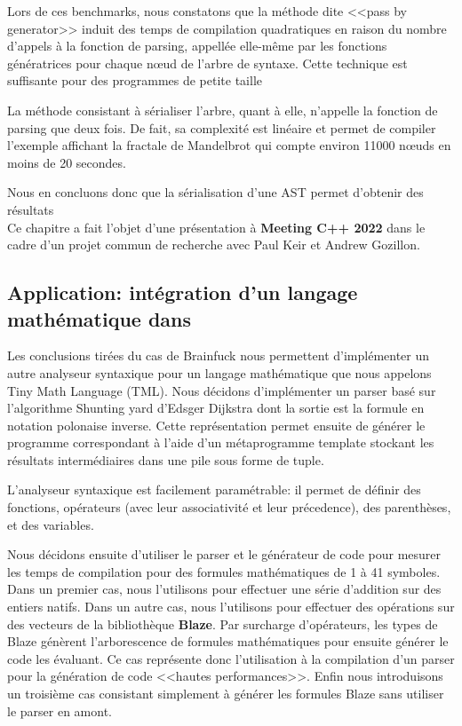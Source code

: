 \documentclass[main]{subfiles}
\begin{document}
Lors de ces benchmarks, nous constatons que la m\'ethode dite
<<pass by generator>> induit des temps de compilation quadratiques en raison
du nombre d'appels \`a la fonction de parsing, appell\'ee elle-m\^eme par les
fonctions g\'en\'eratrices pour chaque n\oe{}ud de l'arbre de syntaxe.
Cette technique est suffisante pour des programmes de petite taille

La m\'ethode consistant \`a s\'erialiser l'arbre, quant \`a elle, n'appelle
la fonction de parsing que deux fois. De fait, sa complexit\'e est lin\'eaire
et permet de compiler l'exemple affichant la fractale de Mandelbrot qui compte
environ 11000 n\oe{}uds en moins de 20 secondes.

Nous en concluons donc que la s\'erialisation d'une AST permet d'obtenir des
r\'esultats
\\

Ce chapitre a fait l'objet d'une pr\'esentation \`a \textbf{Meeting C++ 2022}
dans le cadre d'un projet commun de recherche avec Paul Keir et Andrew Gozillon.

\subsection*{
  Application: int\'egration d'un langage math\'ematique dans \cpp
}

Les conclusions tir\'ees du cas de Brainfuck nous permettent d'impl\'ementer
un autre analyseur syntaxique pour un langage math\'ematique que nous appelons
Tiny Math Language (TML). Nous d\'ecidons d'impl\'ementer un parser bas\'e sur
l'algorithme Shunting yard d'Edsger Dijkstra dont la sortie est la formule
en notation polonaise inverse. Cette repr\'esentation permet ensuite de
g\'en\'erer le programme correspondant \`a l'aide d'un m\'etaprogramme template
stockant les r\'esultats interm\'ediaires dans une pile sous forme de tuple.

L'analyseur syntaxique est facilement param\'etrable: il permet de d\'efinir des
fonctions, op\'erateurs (avec leur associativit\'e et leur pr\'ecedence),
des parenth\`eses, et des variables.

Nous d\'ecidons ensuite d'utiliser le parser et le g\'en\'erateur de code
pour mesurer les temps de compilation pour des formules math\'ematiques
de 1 \`a 41 symboles. Dans un premier cas, nous l'utilisons pour effectuer une
s\'erie d'addition sur des entiers natifs.
Dans un autre cas, nous l'utilisons pour effectuer des op\'erations sur des
vecteurs de la biblioth\`eque \textbf{Blaze}. Par surcharge d'op\'erateurs,
les types de Blaze g\'en\`erent l'arborescence de formules math\'ematiques
pour ensuite g\'en\'erer le code les \'evaluant. Ce cas repr\'esente donc
l'utilisation \`a la compilation d'un parser pour la g\'en\'eration de code
<<hautes performances>>.
Enfin nous introduisons un troisi\`eme cas consistant simplement \`a
g\'en\'erer les formules Blaze sans utiliser le parser en amont.
\end{document}
